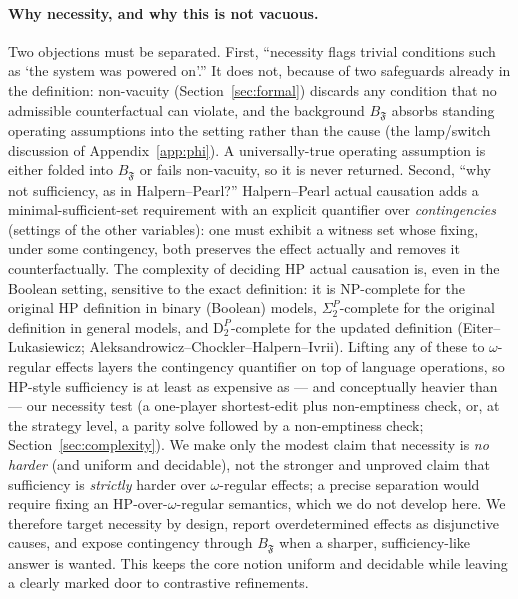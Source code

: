 \documentclass[11pt]{article}
\theoremstyle{remark}
\newcommand{\Frame}{\mathfrak{F}}
\begin{document}
\paragraph{Why necessity, and why this is not vacuous.} Two objections must be
separated. First, ``necessity flags trivial conditions such as `the system was
powered on'.'' It does not, because of two safeguards already in the definition:
non-vacuity (Section~\ref{sec:formal}) discards any condition that no admissible
counterfactual can violate, and the background \(B_{\Frame}\) absorbs standing
operating assumptions into the setting rather than the cause (the lamp/switch
discussion of Appendix~\ref{app:phi}). A universally-true operating assumption is
either folded into \(B_{\Frame}\) or fails non-vacuity, so it is never returned.
Second, ``why not sufficiency, as in Halpern--Pearl?'' Halpern--Pearl actual
causation adds a minimal-sufficient-set requirement with an explicit
quantifier over \emph{contingencies} (settings of the other variables): one must
exhibit a witness set whose fixing, under some contingency, both preserves the
effect actually and removes it counterfactually. The complexity of deciding HP
actual causation is, even in the Boolean setting, sensitive to the exact
definition: it is \(\mathrm{NP}\)-complete for the original HP definition in
binary (Boolean) models, \(\Sigma_2^{P}\)-complete for the original definition in
general models, and \(\mathrm{D}_2^{P}\)-complete for the updated definition
(Eiter--Lukasiewicz; Aleksandrowicz--Chockler--Halpern--Ivrii). Lifting any of
these to \(\omega\)-regular effects layers the contingency quantifier on top of
language operations, so HP-style sufficiency is at least as expensive as --- and
conceptually heavier than --- our necessity test (a one-player shortest-edit plus
non-emptiness check, or, at the strategy level, a parity solve followed by a
non-emptiness check; Section~\ref{sec:complexity}). We make only the modest claim that
necessity is \emph{no harder} (and uniform and decidable), not the stronger and
unproved claim that sufficiency is \emph{strictly} harder over \(\omega\)-regular
effects; a precise separation would require fixing an HP-over-\(\omega\)-regular
semantics, which we do not develop here. We therefore target necessity by design, report
overdetermined effects as disjunctive causes, and expose contingency through
\(B_{\Frame}\) when a sharper, sufficiency-like answer is wanted. This keeps the core notion uniform and decidable while leaving
a clearly marked door to contrastive refinements.
\end{document}
